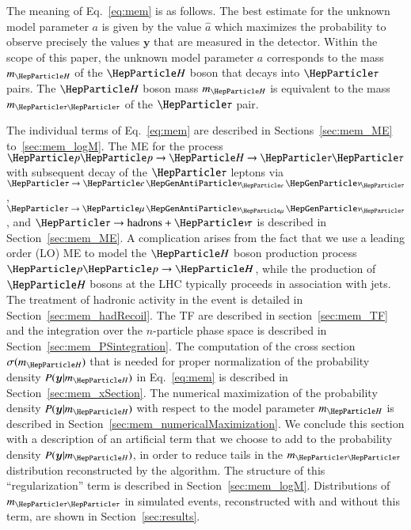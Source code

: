 The meaning of Eq.~\ref{eq:mem} is as follows.
The best estimate for the unknown model parameter $a$ is given by the
value $\hat{a}$ which maximizes the probability to observe precisely the 
values $\bm{y}$ that are measured in the detector. 
Within the scope of this paper, the unknown model parameter $a$
corresponds to the mass $m_{\PHiggs}$ of the $\PHiggs$ boson that decays into $\Pgt$ pairs.
The $\PHiggs$ boson mass $m_{\PHiggs}$ is equivalent to the mass $m_{\Pgt\Pgt}$ of the $\Pgt$ pair.

The individual terms of Eq.~\ref{eq:mem} are described in
Sections~\ref{sec:mem_ME} to~\ref{sec:mem_logM}.
The ME for the process $\Pp\Pp \to \PHiggs \to \Pgt\Pgt$
with subsequent decay of the $\Pgt$ leptons 
via $\Pgt \to \enunu$, $\Pgt \to \mununu$, and $\Pgt \to \textrm{hadrons} + \Pnut$
is described in Section~\ref{sec:mem_ME}.
A complication arises from the fact that we use a leading order (LO)
ME to model the $\PHiggs$ boson production process $\Pp\Pp \to
\PHiggs$, while the production of $\PHiggs$ bosons at the LHC typically
proceeds in association with jets.
The treatment of hadronic activity in the event is detailed in Section~\ref{sec:mem_hadRecoil}.
The TF are described in section~\ref{sec:mem_TF} and
the integration over the $n$-particle phase space is described in
Section~\ref{sec:mem_PSintegration}.
The computation of the cross section $\sigma(m_{\PHiggs})$ that is needed for proper normalization of the probability density $P(\bm{y}|m_{\PHiggs})$
in Eq.~\ref{eq:mem} is described in Section~\ref{sec:mem_xSection}.
The numerical maximization of the probability density $P(\bm{y}|m_{\PHiggs})$
with respect to the model parameter $m_{\PHiggs}$ is described in
Section~\ref{sec:mem_numericalMaximization}.
We conclude this section with a description of an artificial term that we
choose to add to the probability density $P(\bm{y}|m_{\PHiggs})$, in
order to reduce tails in the $m_{\Pgt\Pgt}$ distribution reconstructed
by the algorithm. The structure of this ``regularization'' term is described in
Section~\ref{sec:mem_logM}.
Distributions of $m_{\Pgt\Pgt}$ in simulated events,
reconstructed with and without this term, are shown in Section~\ref{sec:results}.



